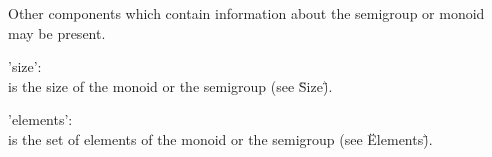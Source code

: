 Other components which contain information about  the semigroup or monoid
may be present.

'size': \\
        is the size of the monoid or the semigroup (see \"Size\"). 

'elements': \\
        is the  set  of elements  of the  monoid  or the  semigroup  (see 
        \"Elements\").



